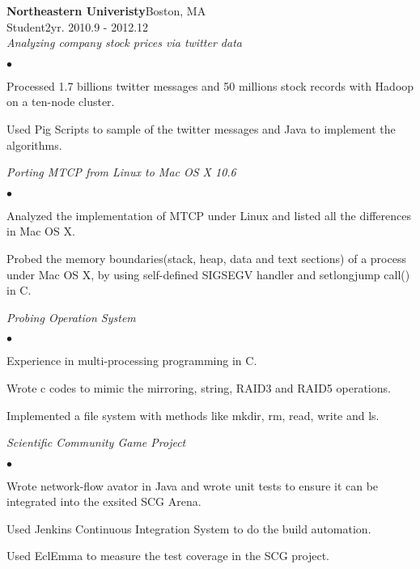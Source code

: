 \documentclass[10pt]{article}
\newcommand{\company}[5]{
    \large{\textbf{#1}}\hfill \small{#3}\\
    #2\hfill \small{#4}\small{#5}\\
}
\newcommand{\project}[1]{\checkmark\normalsize{{\emph{#1}}}\\}
\newenvironment{achievements}
    {\begin{list}
        {$\bullet$}{\topsep 0pt \itemsep -1pt}} 
    {\end{list}}
\newcommand{\college}[5]{
    \textbf{#1 #2} \hfill #3 \\ #4 \\ #5
}
\begin{document}
\vspace*{5pt}
  \company{Northeastern Univeristy}{Student}{Boston, MA}{2yr. }{2010.9 - 2012.12}

  \project{Analyzing company stock prices via twitter data}
  \begin{achievements}
\item Processed 1.7 billions twitter messages and 50 millions stock records with Hadoop on a ten-node cluster.
\item Used Pig Scripts to sample of the twitter messages and Java to implement the algorithms.
  \end{achievements}

  \project{Porting MTCP from Linux to Mac OS X 10.6}
  \begin{achievements}
\item Analyzed the implementation of MTCP under Linux and listed all the differences in Mac OS X.
\item Probed the memory boundaries(stack, heap, data and text sections) of a process under Mac OS X, by using self-defined SIGSEGV handler and setlongjump call() in C.
  \end{achievements}

\project{Probing Operation System}
  \begin{achievements}
\item Experience in multi-processing programming in C.
\item Wrote c codes to mimic the mirroring, string, RAID3 and RAID5 operations.
\item Implemented a file system with methods like mkdir, rm, read, write and ls.
  \end{achievements}

\project{Scientific Community Game Project}
  \begin{achievements}
\item Wrote network-flow avator in Java and wrote unit tests to ensure it can be integrated into the exsited SCG Arena.
\item Used Jenkins Continuous Integration System to do the build automation.
\item Used EclEmma to measure the test coverage in the SCG project.
  \end{achievements}

\vspace*{10pt}

\end{document}
